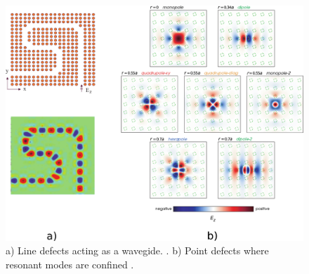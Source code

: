 \begin{figure}
\centering
\includegraphics[scale=0.7]{./img/pcs.pdf}
\caption{a) Line defects acting as a wavegide.  \cite{Jin2010}. b) Point defects where resonant modes are confined  \cite{Joannopoulos2008}.}
\label{fig:guide_point}
\end{figure}
